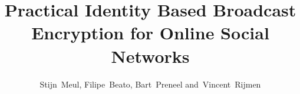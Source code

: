 \documentclass[journal]{IEEEtran}
\begin{document}
%
\title{Practical Identity Based Broadcast Encryption for Online Social Networks}
%
%
%

\author{Stijn~Meul,
        Filipe~Beato,
        Bart~Preneel
        and~Vincent~Rijmen%
}

% 
%



\markboth{}%
{}
% 




\end{document}
